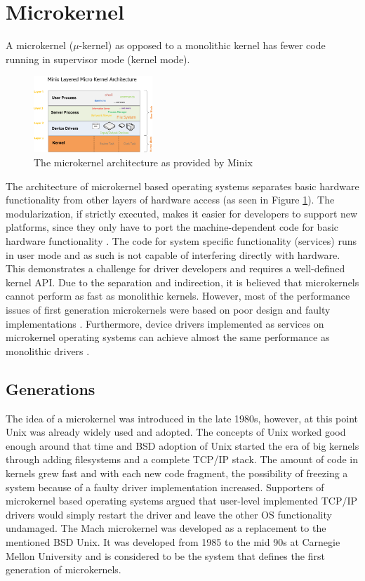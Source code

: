\documentclass{acm_proc_article-sp}
\begin{document}
\section{Microkernel}
\label{sec:microkernel}
A microkernel ($\mu$-kernel) as opposed to a monolithic kernel has fewer code running in
supervisor mode (kernel mode).
\begin{figure}[!h]
\centering
\includegraphics[width=0.4\textwidth]{minixinternalstructure.png}
\caption{The microkernel architecture as provided by Minix \cite{minix}}
\label{fig:minixmicarch}
\end{figure}
The architecture of microkernel based operating systems separates basic
hardware functionality from other layers of hardware access (as seen in Figure \ref{fig:minixmicarch}).
The modularization, if strictly executed, makes it easier for developers to support new
platforms, since they only have to port the machine-dependent code for basic hardware functionality \cite{black92}.
The code for system specific functionality (services) runs in user mode and as such
is not capable of interfering directly with hardware.
This demonstrates a challenge for driver developers and requires a well-defined kernel API.
Due to the separation and indirection, it is believed that microkernels cannot perform as fast as
monolithic kernels.
However, most of the performance issues of first generation microkernels were based on poor design
and faulty implementations \cite{p237-liedtke}.
Furthermore, device drivers implemented as services on microkernel operating systems can achieve
almost the same performance as monolithic drivers \cite{uldd}.

\subsection{Generations}
The idea of a microkernel was introduced in the late 1980s, however, at this point Unix \cite{unix}
was already widely used and adopted.
The concepts of Unix worked good enough around that time and BSD \cite{bsd} adoption of Unix started
the era of big kernels through adding filesystems and a complete TCP/IP stack. %
The amount of code in kernels grew fast and with each new code fragment, the possibility of
freezing a system because of a faulty driver implementation increased.
Supporters of microkernel based operating systems argued that user-level implemented TCP/IP drivers
would simply restart the driver and leave the other OS functionality undamaged.
The Mach \cite{mach} microkernel was developed as a replacement to the mentioned BSD Unix.
It was developed from 1985 to the mid 90s at Carnegie Mellon University and is considered to be
the system that defines the first generation of microkernels.
\end{document}
